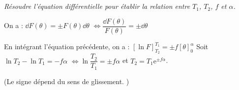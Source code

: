 \begin{multicols}{2}
\begin{multicols}{2}
\begin{corrige}
%
%
%
%
%
%
%
%

\end{corrige}
\else
\fi

\subparagraph{}\textit{Résoudre l'équation différentielle pour établir la relation entre $T_1$, $T_2$, $f$ et $\alpha$.}
\ifprof
\begin{corrige}
On a :
 $ \dd F(\theta)= \pm  F\left(\theta\right) \dd \theta $
  $ \Leftrightarrow \dfrac{ \dd F(\theta)}{ F\left(\theta\right)}= \pm \dd \theta $
  
  En intégrant l'équation précédente, on a :
  $\left[ \ln F \right] _{T_2}^{T_1} =\pm f \left[ \theta \right] _{0}^{\alpha}$
  Soit $\ln T_2 - \ln T_1 = -f\alpha$ $\Leftrightarrow \ln \dfrac{T_2}{T_1} = \pm f\alpha$ et $T_2 = T_1 \text{e}^{\pm f\alpha}$.
  
(Le signe dépend du sens de glissement. )
\end{corrige}
\else
\fi

\ifprof
\end{multicols}
\else
\end{multicols}
\fi
